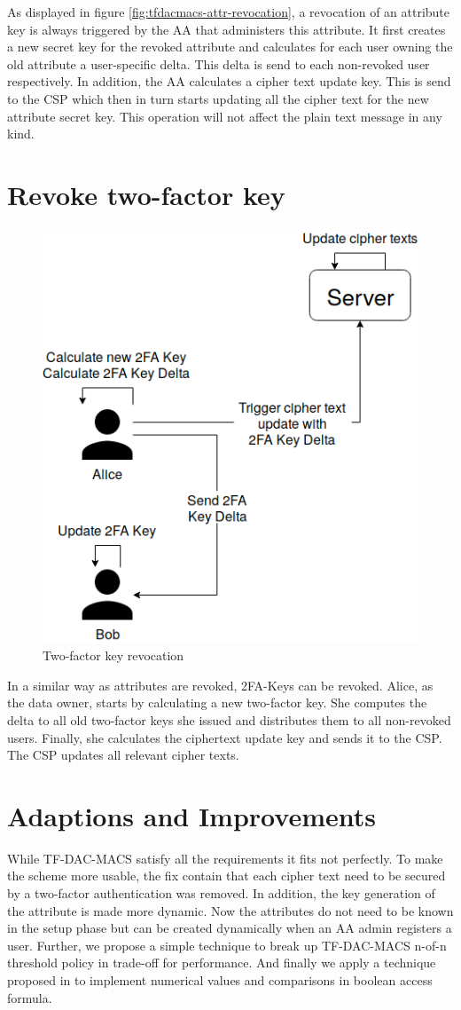 As displayed in figure \ref{fig:tfdacmacs-attr-revocation}, a revocation of an attribute key is always triggered by the AA that administers this attribute. It first creates a new secret key for the revoked attribute and calculates for each user owning the old attribute a user-specific delta. This delta is send to each non-revoked user respectively. In addition, the AA calculates a cipher text update key. This is send to the CSP which then in turn starts updating all the cipher text for the new attribute secret key. This operation will not affect the plain text message in any kind. 

\section{Revoke two-factor key}
\begin{figure}[!t]
\centering
    \includegraphics[width=0.6\linewidth]{img/TF-DAC-MACS-overview-revoce-user-key.png}
    \caption{Two-factor key revocation}
    \label{fig:tfdacmacs-user-auth-key-revocation}
\end{figure}

In a similar way as attributes are revoked, 2FA-Keys can be revoked. Alice, as the data owner, starts  by calculating a new two-factor key. She computes the delta to all old two-factor keys she issued and distributes them to all non-revoked users. Finally, she calculates the ciphertext update key and sends it to the CSP. The CSP updates all relevant cipher texts.

\section{Adaptions and Improvements}
While TF-DAC-MACS satisfy all the requirements it fits not perfectly. To make the scheme more usable, the fix contain that each cipher text need to be secured by a two-factor authentication was removed. In addition, the key generation of the attribute is made more dynamic. Now the attributes do not need to be known in the setup phase but can be created dynamically when an AA admin registers a user. Further, we propose a simple technique to break up TF-DAC-MACS n-of-n threshold policy in trade-off for performance. And finally we apply a technique proposed in \cite{bethencourt2007ciphertext} to implement numerical values and comparisons in boolean access formula. 

